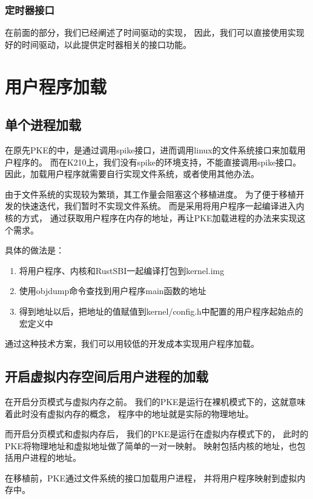 \subsubsection{定时器接口}

在前面的部分，我们已经阐述了时间驱动的实现，
因此，我们可以直接使用实现好的时间驱动，以此提供定时器相关的接口功能。


\section{用户程序加载}

\subsection{单个进程加载}

在原先PKE的中，是通过调用spike接口，进而调用linux的文件系统接口来加载用户程序的。
而在K210上，我们没有spike的环境支持，不能直接调用spike接口。
因此，加载用户程序就需要自行实现文件系统，或者使用其他办法。

由于文件系统的实现较为繁琐，其工作量会阻塞这个移植进度。
为了便于移植开发的快速迭代，我们暂时不实现文件系统。
而是采用将用户程序一起编译进入内核的方式，
通过获取用户程序在内存的地址，再让PKE加载进程的办法来实现这个需求。

具体的做法是：

\begin{enumerate}
    \item 将用户程序、内核和RustSBI一起编译打包到kernel.img
    \item 使用objdump命令查找到用户程序main函数的地址
    \item 得到地址以后，把地址的值赋值到kernel/config.h中配置的用户程序起始点的宏定义中
\end{enumerate}

通过这种技术方案，我们可以用较低的开发成本实现用户程序加载。

\subsection{开启虚拟内存空间后用户进程的加载}

在开启分页模式与虚拟内存之前。
我们的PKE是运行在裸机模式下的，这就意味着此时没有虚拟内存的概念，
程序中的地址就是实际的物理地址。

而开启分页模式和虚拟内存后，
我们的PKE是运行在虚拟内存模式下的，
此时的PKE将物理地址和虚拟地址做了简单的一对一映射。
映射包括内核的地址，也包括用户进程的地址。

在移植前，PKE通过文件系统的接口加载用户进程，
并将用户程序映射到虚拟内存中。

